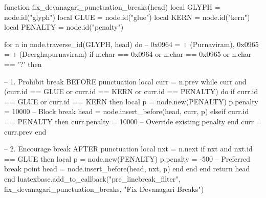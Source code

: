 \newcommand{\tabledefaultalign}{\raggedright}
\newcolumntype{K}{>{\tabledefaultalign\arraybackslash}X}
\newcommand{\settablealign}[1]{%
    \ifthenelse{\equal{#1}{Right}}{%
        \renewcommand{\tabledefaultalign}{\raggedleft}%
    }{%
        \renewcommand{\tabledefaultalign}{\raggedright}%
    }%
}


\usepackage{luacode}
\begin{luacode*}
function fix_devanagari_punctuation_breaks(head)
  local GLYPH = node.id("glyph")
  local GLUE  = node.id("glue")
  local KERN  = node.id("kern")
  local PENALTY = node.id("penalty")

  for n in node.traverse_id(GLYPH, head) do
    -- 0x0964 = । (Purnaviram), 0x0965 = ॥ (Deerghapurnaviram)
    if n.char == 0x0964 or n.char == 0x0965 or n.char == '?' then
      
      -- 1. Prohibit break BEFORE punctuation
      local curr = n.prev
      while curr and (curr.id == GLUE or curr.id == KERN or curr.id == PENALTY) do
        if curr.id == GLUE or curr.id == KERN then
            local p = node.new(PENALTY)
            p.penalty = 10000 -- Block break
            head = node.insert_before(head, curr, p)
        elseif curr.id == PENALTY then
            curr.penalty = 10000 -- Override existing penalty
        end
        curr = curr.prev
      end
      
      -- 2. Encourage break AFTER punctuation
      local nxt = n.next
      if nxt and nxt.id == GLUE then
         local p = node.new(PENALTY)
         p.penalty = -500 -- Preferred break point
         head = node.insert_before(head, nxt, p)
      end
    end
  end
  return head
end
luatexbase.add_to_callback("pre_linebreak_filter", fix_devanagari_punctuation_breaks, "Fix Devanagari Breaks")
\end{luacode*}

\sloppy
\emergencystretch=5cm

\sloppy
\emergencystretch=5cm




